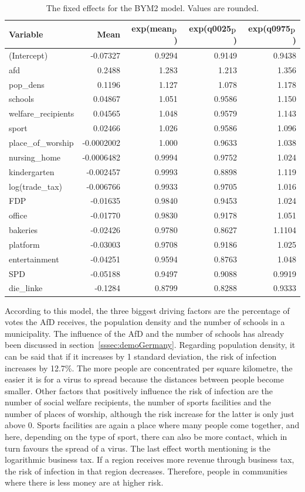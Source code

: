 \begin{table}[H] 
\caption{The fixed effects for the BYM2 model. Values are rounded. \label{fixedAllGermany}}
\begin{tabular}{l r r r r}
\toprule
\textbf{Variable}	& \textbf{Mean}	& \textbf{exp(mean$_{\hbox{p}}$)} & \textbf{exp(q0025$_{\hbox{p}}$)} & \textbf{exp(q0975$_{\hbox{p}}$)} \\
\midrule
(Intercept) & -0.07327 & 0.9294 & 0.9149 & 0.9438 \\
afd & 0.2488 & 1.283 & 1.213 & 1.356 \\
pop\_dens & 0.1196 & 1.127 & 1.078 & 1.178 \\
schools & 0.04867 & 1.051 & 0.9586 & 1.150 \\
welfare\_recipients & 0.04565 & 1.048 & 0.9579 & 1.143 \\
sport & 0.02466 & 1.026 & 0.9586 & 1.096 \\
place\_of\_worship & -0.0002002 & 1.000 & 0.9633 & 1.038 \\
nursing\_home & -0.0006482 & 0.9994 & 0.9752 & 1.024 \\
kindergarten & -0.002457 &  0.9993 & 0.8898 & 1.119 \\
log(trade\_tax) & -0.006766 & 0.9933 & 0.9705 & 1.016 \\
FDP & -0.01635 & 0.9840 & 0.9453 & 1.024 \\
office & -0.01770 & 0.9830 & 0.9178 & 1.051 \\
bakeries & -0.02426 & 0.9780 & 0.8627 & 1.1104 \\
platform & -0.03003 & 0.9708 & 0.9186 & 1.025 \\
entertainment & -0.04251 & 0.9594 & 0.8763 & 1.048 \\
SPD & -0.05188 & 0.9497 & 0.9088 & 0.9919 \\
die\_linke & -0.1284 &  0.8799 & 0.8288 & 0.9333\\
\bottomrule
\end{tabular}
\end{table}
According to this model, the three biggest driving factors are the percentage of votes the AfD receives, the population density and the number of schools in a municipality. The influence of the AfD and the number of schools has already been discussed in section~\ref{sssec:demoGermany}. Regarding population density, it can be said that if it increases by 1 standard deviation, the risk of infection increases by 12.7\%. The more people are concentrated per square kilometre, the easier it is for a virus to spread because the distances between people become smaller. Other factors that positively influence the risk of infection are the number of social welfare recipients, the number of sports facilities and the number of places of worship, although the risk increase for the latter is only just above 0. Sports facilities are again a place where many people come together, and here, depending on the type of sport, there can also be more contact, which in turn favours the spread of a virus. The last effect worth mentioning is the logarithmic business tax. If a region receives more revenue through business tax, the risk of infection in that region decreases. Therefore, people in communities where there is less money are at higher risk. 
